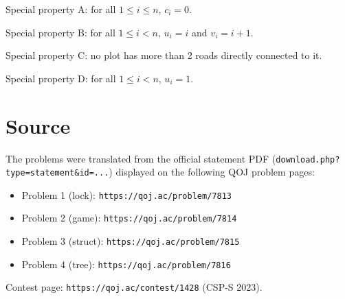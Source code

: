 \documentclass[11pt]{article}
\begin{document}
Special property A: for all $1 \le i \le n$, $c_i = 0$.

Special property B: for all $1 \le i < n$, $u_i = i$ and $v_i = i + 1$.

Special property C: no plot has more than 2 roads directly connected to
it.

Special property D: for all $1 \le i < n$, $u_i = 1$.

\section*{Source}

The problems were translated from the official statement PDF
(\texttt{download.php?type=statement\&id=...}) displayed on the following
QOJ problem pages:
\begin{itemize}
\item Problem 1 (lock): \texttt{https://qoj.ac/problem/7813}
\item Problem 2 (game): \texttt{https://qoj.ac/problem/7814}
\item Problem 3 (struct): \texttt{https://qoj.ac/problem/7815}
\item Problem 4 (tree): \texttt{https://qoj.ac/problem/7816}
\end{itemize}
Contest page: \texttt{https://qoj.ac/contest/1428} (CSP-S 2023).
\end{document}
